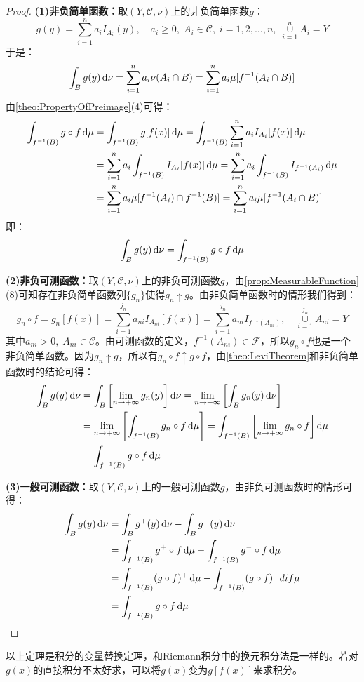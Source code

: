 \begin{proof}
	\textbf{(1)非负简单函数：}取$(Y,\mathscr{C},\nu)$上的非负简单函数$g$：
	\begin{equation*}
		g(y)=\sum_{i=1}^{n}a_iI_{A_i}(y),\quad a_i\geqslant0,\;A_i\in\mathscr{C},\;i=1,2,\dots,n,\;\underset{i=1}{\overset{n}{\cup}}A_i=Y
	\end{equation*}
	于是：
	\begin{equation*}
		\int_{B}g(y)\mathop{}\!\mathrm{d}\nu=\sum_{i=1}^{n}a_i\nu(A_i\cap B)=\sum_{i=1}^{n}a_i\mu[f^{-1}(A_i\cap B)]
	\end{equation*}
	由\cref{theo:PropertyOfPreimage}(4)可得：
	\begin{align*}
		\int_{f^{-1}(B)}g\circ f\mathop{}\!\mathrm{d}\mu&=\int_{f^{-1}(B)}g[f(x)]\mathop{}\!\mathrm{d}\mu=\int_{f^{-1}(B)}\sum_{i=1}^{n}a_iI_{A_i}[f(x)]\mathop{}\!\mathrm{d}\mu \\
		&=\sum_{i=1}^{n}a_i\int_{f^{-1}(B)}I_{A_i}[f(x)]\mathop{}\!\mathrm{d}\mu=\sum_{i=1}^{n}a_i\int_{f^{-1}(B)}I_{f^{-1}(A_i)}\mathop{}\!\mathrm{d}\mu \\
		&=\sum_{i=1}^{n}a_i\mu[f^{-1}(A_i)\cap f^{-1}(B)]=\sum_{i=1}^{n}a_i\mu[f^{-1}(A_i\cap B)]
	\end{align*}
	即：
	\begin{equation*}
		\int_{B}g(y)\mathop{}\!\mathrm{d}\nu=\int_{f^{-1}(B)}g\circ f\mathop{}\!\mathrm{d}\mu
	\end{equation*}\par
	\textbf{(2)非负可测函数：}取$(Y,\mathscr{C},\nu)$上的非负可测函数$g$，由\cref{prop:MeasurableFunction}(8)可知存在非负简单函数列$\{g_n\}$使得$g_n\uparrow g$。由非负简单函数时的情形我们得到：
	\begin{equation*}
		g_n\circ f=g_n[f(x)]=\sum_{i=1}^{j_n}a_{ni}I_{A_{ni}}[f(x)]=\sum_{i=1}^{j_n}a_{ni}I_{f^{-1}(A_{ni})},\quad\underset{i=1}{\overset{j_n}{\cup}}A_{ni}=Y
	\end{equation*}
	其中$a_{ni}>0,\;A_{ni}\in\mathscr{C}$。由可测函数的定义，$f^{-1}(A_{ni})\in\mathscr{F}$，所以$g_n\circ f$也是一个非负简单函数。因为$g_n\uparrow g$，所以有$g_n\circ f\uparrow g\circ f$，由\cref{theo:LeviTheorem}和非负简单函数时的结论可得：
	\begin{align*}
		\int_{B}g(y)\mathop{}\!\mathrm{d}\nu&=\int_{B}\left[\lim_{n\to+\infty}g_n(y)\right]\mathop{}\!\mathrm{d}\nu
		=\lim_{n\to+\infty}\left[\int_{B}g_n(y)\mathop{}\!\mathrm{d}\nu\right] \\
		&=\lim_{n\to+\infty}\left[\int_{f^{-1}(B)}g_n\circ f\mathop{}\!\mathrm{d}\mu\right]
		=\int_{f^{-1}(B)}\left[\lim_{n\to+\infty}g_n\circ f\right]\mathop{}\!\mathrm{d}\mu \\
		&=\int_{f^{-1}(B)}g\circ f\mathop{}\!\mathrm{d}\mu
	\end{align*}\par
	\textbf{(3)一般可测函数：}取$(Y,\mathscr{C},\nu)$上的一般可测函数$g$，由非负可测函数时的情形可得：
	\begin{align*}
		\int_{B}g(y)\mathop{}\!\mathrm{d}\nu&=\int_{B}g^+(y)\mathop{}\!\mathrm{d}\nu-\int_{B}g^-(y)\mathop{}\!\mathrm{d}\nu \\
		&=\int_{f^{-1}(B)}g^+\circ f\mathop{}\!\mathrm{d}\mu-\int_{f^{-1}(B)}g^-\circ f\mathop{}\!\mathrm{d}\mu \\
		&=\int_{f^{-1}(B)}(g\circ f)^+\mathop{}\!\mathrm{d}\mu-\int_{f^{-1}(B)}(g\circ f)^-dif\mu \\
		&=\int_{f^{-1}(B)}g\circ f\mathop{}\!\mathrm{d}\mu\qedhere
	\end{align*}
\end{proof}
\begin{note}
	以上定理是积分的变量替换定理，和Riemann积分中的换元积分法是一样的。若对$g(x)$的直接积分不太好求，可以将$g(x)$变为$g[f(x)]$来求积分。
\end{note}